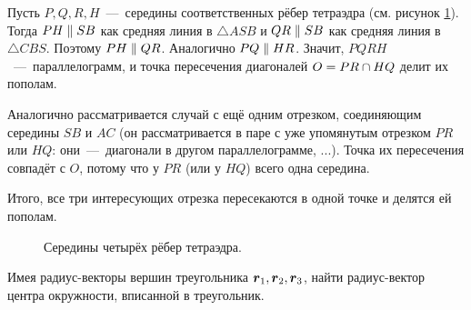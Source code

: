 \documentclass[a4paper,12pt]{article}
\begin{document}
  \begin{solution}
    Пусть $P, Q, R, H$~---~середины соответственных рёбер тетраэдра (см. рисунок \ref{fig:tetrahedron}).
    Тогда $PH \hm\parallel SB$ как средняя линия в $\triangle ASB$ и $QR \hm\parallel SB$ как средняя линия в $\triangle CBS$.
    Поэтому $PH \hm\parallel QR$.
    Аналогично $PQ \hm\parallel HR$.
    Значит, $PQRH$~---~параллелограмм, и точка пересечения диагоналей $O \hm= PR \hm\cap HQ$ делит их пополам.
    
    Аналогично рассматривается случай с ещё одним отрезком, соединяющим середины $SB$ и $AC$ (он рассматривается в паре с уже упомянутым отрезком $PR$ или $HQ$: они~---~диагонали в другом параллелограмме, ...). Точка их пересечения совпадёт с $O$, потому что у $PR$ (или у $HQ$) всего одна середина.
    
    Итого, все три интересующих отрезка пересекаются в одной точке и делятся ей пополам.
    
    \begin{figure}[h]
      \centering
      
      
      \caption{Середины четырёх рёбер тетраэдра.}
      \label{fig:tetrahedron}
    \end{figure}
  \end{solution}
  
  
  \begin{problem}[1.36]
    Имея радиус-векторы вершин треугольника $\boldsymbol r_1, \boldsymbol r_2, \boldsymbol r_3$, найти радиус-вектор центра окружности, вписанной в треугольник.
  \end{problem}
  
\end{document}
